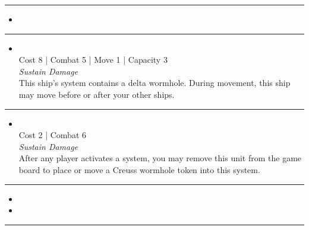 \begin{multicols}{2}
\rule{\hsize}{0.4pt}\vspace{5pt}


\begin{itemize}
\item \gravdrive
\end{itemize}

\vspace{-10pt}\rule{\hsize}{0.4pt}\vspace{5pt}


\begin{itemize}
\item {}\\
Cost 8 | Combat 5 | Move 1 | Capacity 3 \\
\emph{Sustain Damage}\\
This ship's system contains a delta wormhole. During movement, this ship may move before or after your other ships.
\end{itemize}

\vspace{-10pt}\rule{\hsize}{0.4pt}\vspace{5pt}


\begin{itemize}
\item {}
\\
Cost 2 | Combat 6 \\
\emph{Sustain Damage}\\
After any player activates a system, you may remove this unit from the game board to place or move a Creuss wormhole token into this system. 
\end{itemize}

\vspace{-10pt}\rule{\hsize}{0.4pt}\vspace{5pt}

\nounits

\columnbreak
{}

\begin{itemize}
\item \wormholeGenerator
\item \splicer
\end{itemize}

\vspace{-10pt}\rule{\hsize}{0.4pt}\vspace{5pt}


\end{multicols}
